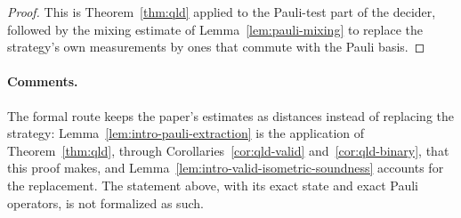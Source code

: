 \begin{proof}
This is Theorem~\ref{thm:qld} applied to the Pauli-test part of the decider, followed by the
mixing estimate of Lemma~\ref{lem:pauli-mixing} to replace the strategy's own measurements by ones that
commute with the Pauli basis.
\end{proof}

\paragraph{Comments.} The formal route keeps the paper's estimates as distances instead of
replacing the strategy: Lemma~\ref{lem:intro-pauli-extraction} is the application of
Theorem~\ref{thm:qld}, through Corollaries~\ref{cor:qld-valid} and~\ref{cor:qld-binary}, that this
proof makes, and Lemma~\ref{lem:intro-valid-isometric-soundness} accounts for the replacement. The
statement above, with its exact state and exact Pauli operators, is not formalized as such.

\effortHard

